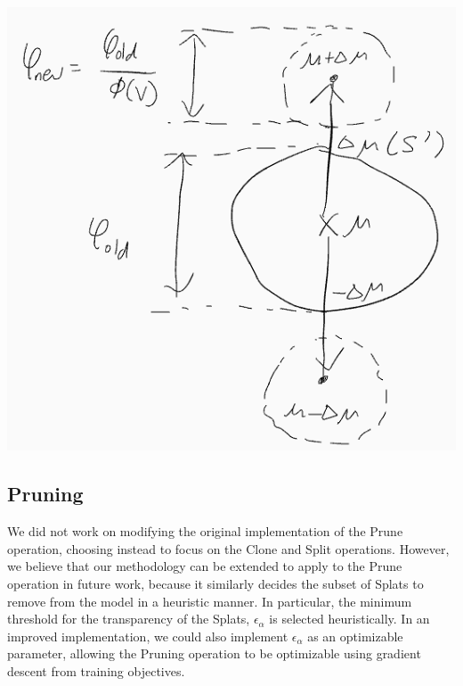 \documentclass[11pt]{report}
\begin{document}
\begin{center}
\begin{minipage}{0.4\linewidth}
\includegraphics[width = \linewidth]{assets/split}
\end{minipage}
\end{center}

\subsection{Pruning}
We did not work on modifying the original implementation of the Prune operation, choosing instead to focus on the Clone and Split operations. However, we believe that our methodology can be extended to apply to the Prune operation in future work, because it similarly decides the subset of Splats to remove from the model in a heuristic manner. In particular, the minimum threshold for the transparency of the Splats, $\epsilon_{\alpha}$ is selected heuristically. In an improved implementation, we could also implement $\epsilon_{\alpha}$ as an optimizable parameter, allowing the Pruning operation to be optimizable using gradient descent from training objectives.

\end{document}
